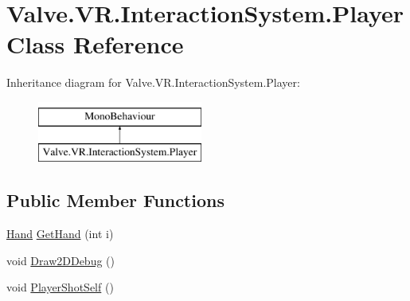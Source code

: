 \hypertarget{class_valve_1_1_v_r_1_1_interaction_system_1_1_player}{}\section{Valve.\+V\+R.\+Interaction\+System.\+Player Class Reference}
\label{class_valve_1_1_v_r_1_1_interaction_system_1_1_player}
Inheritance diagram for Valve.\+V\+R.\+Interaction\+System.\+Player\+:\begin{figure}[H]
\begin{center}
\leavevmode
\includegraphics[height=2.000000cm]{class_valve_1_1_v_r_1_1_interaction_system_1_1_player}
\end{center}
\end{figure}
\subsection*{Public Member Functions}
\begin{DoxyCompactItemize}
\item 
\mbox{\hyperlink{class_valve_1_1_v_r_1_1_interaction_system_1_1_hand}{Hand}} \mbox{\hyperlink{class_valve_1_1_v_r_1_1_interaction_system_1_1_player_a35d109a7314c2be9516f393f1c2bbb42}{Get\+Hand}} (int i)
\item 
void \mbox{\hyperlink{class_valve_1_1_v_r_1_1_interaction_system_1_1_player_a31a5b321202e3bd3b545c5545bf17b2b}{Draw2\+D\+Debug}} ()
\item 
void \mbox{\hyperlink{class_valve_1_1_v_r_1_1_interaction_system_1_1_player_a1739a9ea9f88c6a0963a172916ef2f70}{Player\+Shot\+Self}} ()
\end{DoxyCompactItemize}
